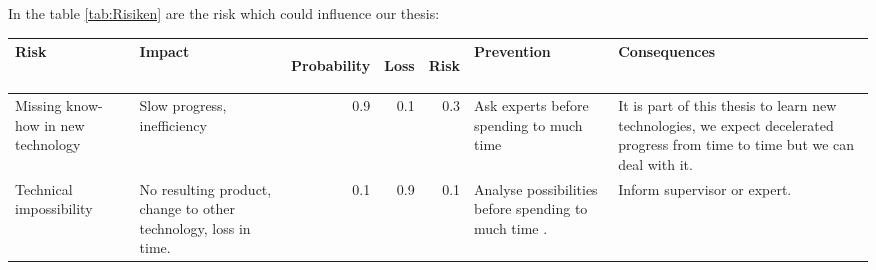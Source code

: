 In the table \ref{tab:Risiken} are the risk which could influence our thesis: 

\begin{tabular}[t]{|p{3cm}|p{3cm}|r|r|r|p{3cm}|p{3cm}|}\hline
\textbf{Risk} &
    \textbf{Impact} &
  \begin{sideways} \textbf{Probability } \end{sideways} &
  \begin{sideways}\textbf{Loss} \end{sideways} &
  \begin{sideways}\textbf{Risk} \end{sideways} &
  \textbf{Prevention} & \textbf{Consequences} \\ \hline
    Missing know-how in new technology & 
    Slow progress, inefficiency & 
    0.9 & 
    0.1 & 
    0.3 & 
    Ask experts before spending to much time & 
    It is part of this thesis to learn new technologies, we expect decelerated
    progress from time to time but we can deal with it. \\ \hline
  Technical impossibility & 
    No resulting product, change to other technology, loss in time. & 
    0.1 & 
    0.9 & 
    0.1 & 
    Analyse possibilities before spending to much time . &
    Inform supervisor or expert.
    \\ \hline
\end{tabular}
\label{tab:Risiken}






